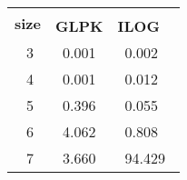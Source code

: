 \begin{center}
  \begin{tabular}{| r | >{\raggedleft\arraybackslash}p{0.9cm} | >{\raggedleft\arraybackslash}p{0.9cm} |}
    \hline
    \multirow{2}{*}{\textbf{size}} & \multicolumn{2}{c|}{\textbf{ILP}} \\
    \cline{02-03}
    & \textbf{GLPK} & \textbf{ILOG} \\
    \hline
    ~3~ & ~0.001~ & ~0.002~ \\
    ~4~ & ~0.001~ & ~0.012~ \\
    ~5~ & ~0.396~ & ~0.055~ \\
    ~6~ & ~4.062~ & ~0.808~ \\
    ~7~ & ~3.660~ & ~94.429~ \\
    \hline
  \end{tabular}
\end{center}
